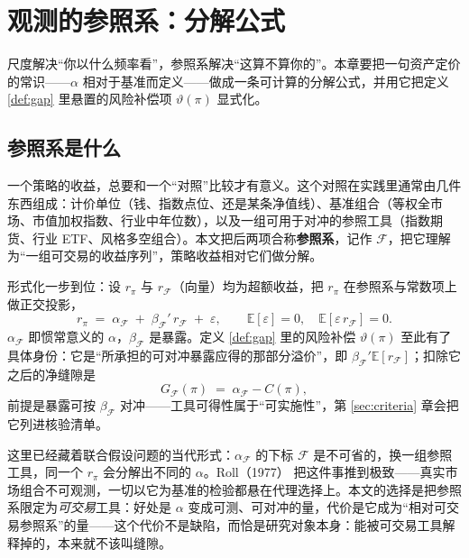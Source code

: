 \section{观测的参照系：分解公式}\label{sec:reference}

尺度解决“你以什么频率看”，参照系解决“这算不算你的”。本章要把一句资产定价的常识——$\alpha$ 相对于基准而定义——做成一条可计算的分解公式，并用它把定义 \ref{def:gap} 里悬置的风险补偿项 $\vartheta(\pi)$ 显式化。

\subsection{参照系是什么}

一个策略的收益，总要和一个“对照”比较才有意义。这个对照在实践里通常由几件东西组成：计价单位（钱、指数点位、还是某条净值线）、基准组合（等权全市场、市值加权指数、行业中年位数），以及一组可用于对冲的参照工具（指数期货、行业 ETF、风格多空组合）。本文把后两项合称\textbf{参照系}，记作 $\mathcal{F}$，把它理解为“一组可交易的收益序列”，策略收益相对它们做分解。

形式化一步到位：设 $r_\pi$ 与 $r_{\mathcal{F}}$（向量）均为超额收益，把 $r_\pi$ 在参照系与常数项上做正交投影，
\begin{equation}
  r_\pi \;=\; \alpha_{\mathcal{F}} \;+\; \beta_{\mathcal{F}}'\,r_{\mathcal{F}} \;+\; \varepsilon, \qquad \mathbb{E}[\varepsilon]=0,\quad \mathbb{E}[\varepsilon\,r_{\mathcal{F}}]=0 .
  \label{eq:projection}
\end{equation}
$\alpha_{\mathcal{F}}$ 即惯常意义的 $\alpha$，$\beta_{\mathcal{F}}$ 是暴露。定义 \ref{def:gap} 里的风险补偿 $\vartheta(\pi)$ 至此有了具体身份：它是“所承担的可对冲暴露应得的那部分溢价”，即 $\beta_{\mathcal{F}}'\mathbb{E}[r_{\mathcal{F}}]$；扣除它之后的净缝隙是
\begin{equation}
  G_{\mathcal{F}}(\pi) \;=\; \alpha_{\mathcal{F}} - C(\pi) ,
  \label{eq:Gf}
\end{equation}
前提是暴露可按 $\beta_{\mathcal{F}}$ 对冲——工具可得性属于“可实施性”，第 \ref{sec:criteria} 章会把它列进核验清单。

这里已经藏着联合假设问题\cite{fama1970}的当代形式：$\alpha_{\mathcal{F}}$ 的下标 $\mathcal{F}$ 是不可省的，换一组参照工具，同一个 $r_\pi$ 会分解出不同的 $\alpha$。Roll（1977）\cite{roll1977} 把这件事推到极致——真实市场组合不可观测，一切以它为基准的检验都悬在代理选择上。本文的选择是把参照系限定为\emph{可交易}工具：好处是 $\alpha$ 变成可测、可对冲的量，代价是它成为“相对可交易参照系”的量——这个代价不是缺陷，而恰是研究对象本身：能被可交易工具解释掉的，本来就不该叫缝隙。

